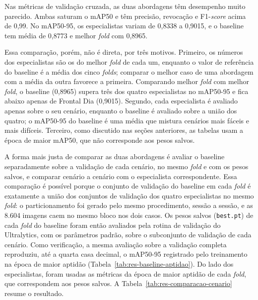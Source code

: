 Nas métricas de validação cruzada, as duas abordagens têm desempenho muito parecido. Ambas saturam o mAP50 e têm precisão, revocação e F1-\textit{score} acima de 0,99. No mAP50-95, os especialistas variam de 0,8338 a 0,9015, e o baseline tem média de 0,8773 e melhor \textit{fold} com 0,8965.

Essa comparação, porém, não é direta, por três motivos. Primeiro, os números dos especialistas são os do melhor \textit{fold} de cada um, enquanto o valor de referência do baseline é a média dos cinco \textit{folds}; comparar o melhor caso de uma abordagem com a média da outra favorece a primeira. Comparando melhor \textit{fold} com melhor \textit{fold}, o baseline (0,8965) supera três dos quatro especialistas no mAP50-95 e fica abaixo apenas de Frontal Dia (0,9015). Segundo, cada especialista é avaliado apenas sobre o seu cenário, enquanto o baseline é avaliado sobre a união dos quatro; o mAP50-95 do baseline é uma média que mistura cenários mais fáceis e mais difíceis. Terceiro, como discutido nas seções anteriores, as tabelas usam a época de maior mAP50, que não corresponde aos pesos salvos.

A forma mais justa de comparar as duas abordagens é avaliar o baseline separadamente sobre a validação de cada cenário, no mesmo \textit{fold} e com os pesos salvos, e comparar cenário a cenário com o especialista correspondente. Essa comparação é possível porque o conjunto de validação do baseline em cada \textit{fold} é exatamente a união dos conjuntos de validação dos quatro especialistas no mesmo \textit{fold}: o particionamento foi gerado pelo mesmo procedimento, sessão a sessão, e as 8.604 imagens caem no mesmo bloco nos dois casos. Os pesos salvos (\texttt{best.pt}) de cada \textit{fold} do baseline foram então avaliados pela rotina de validação do Ultralytics, com os parâmetros padrão, sobre o subconjunto de validação de cada cenário. Como verificação, a mesma avaliação sobre a validação completa reproduziu, até a quarta casa decimal, o mAP50-95 registrado pelo treinamento na época de maior aptidão (Tabela~\ref{tab:res-baseline-aptidao}). Do lado dos especialistas, foram usadas as métricas da época de maior aptidão de cada \textit{fold}, que correspondem aos pesos salvos. A Tabela~\ref{tab:res-comparacao-cenario} resume o resultado.

